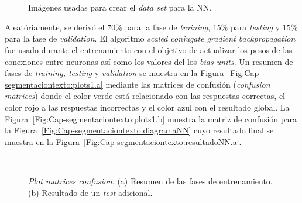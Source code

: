 \begin{figure}[h!]
	\centering
   { }
   { }
   { }
   \\
   { }
   { }
   \\
	\caption{Imágenes usadas para crear el \textit{data set} para la NN.}
	\label{Fig:Cap-segmentaciontexto:dataNN}
\end{figure}

Aleatóriamente, se derivó el $70 \%$ para la fase de \textit{training}, 
$15 \%$ para \textit{testing} y $15 \%$ para la fase de \textit{validation}. El
algoritmo \textit{scaled conjugate gradient backpropagation}
\cite{Moller:1993:ScaledGD} fue usado durante el entrenamiento con el objetivo
de actualizar los pesos de las conexiones entre neuronas así como los valores
del los \textit{bias units}. Un resumen de fases de \textit{training, testing} y
\textit{validation} se muestra en la
Figura~\ref{Fig:Cap-segmentaciontexto:plots1.a} mediante las matrices de
confusión (\textit{confusion matrices}) donde el color verde está relacionado
con las respuestas correctas, el color rojo a las respuestas incorrectas y el
color azul con el resultado global. La
Figura~\ref{Fig:Cap-segmentaciontexto:plots1.b} muestra la matriz de
confusión para la Figura~\ref{Fig:Cap-segmentaciontexto:diagramaNN} cuyo
resultado final se muestra en la
Figura~\ref{Fig:Cap-segmentaciontexto:resultadoNN.a}.

\begin{figure}[h!]
	\centering
   { }
   \\
  \caption[\textit{Plot matrices confusion}]{\textit{Plot matrices confusion}.
  (a) Resumen de las fases de entrenamiento. (b) Resultado de un \textit{test}
adicional.}
	\label{Fig:Cap-segmentaciontexto:plots1}
\end{figure}

